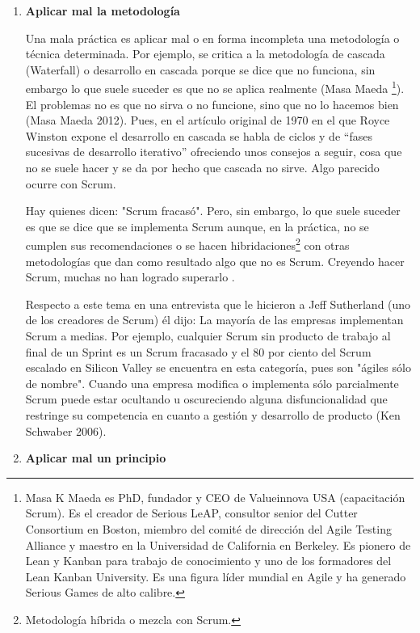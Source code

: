 \begin{enumerate}

\item \textbf{Aplicar mal la metodología}

Una mala práctica es aplicar mal o en forma incompleta una metodología o técnica determinada. Por ejemplo, se critica a la metodología de cascada (Waterfall) o desarrollo en cascada porque se dice que no funciona, sin embargo lo que suele suceder es que no se aplica realmente (Masa Maeda \footnote{Masa K Maeda es PhD, fundador y CEO de Valueinnova USA (capacitación Scrum). Es el creador de Serious LeAP, consultor senior del Cutter Consortium en Boston, miembro del comité de dirección del Agile Testing Alliance y maestro en la Universidad de California en Berkeley. Es pionero de Lean y Kanban para trabajo de conocimiento y uno de los formadores del Lean Kanban University. Es una figura líder mundial en Agile y ha generado Serious Games de alto calibre.}). El problemas no es que no sirva o no funcione, sino que no lo hacemos bien (Masa Maeda  2012). Pues, en el artículo original de 1970 en el que Royce Winston expone el desarrollo en cascada se habla de ciclos y de “fases sucesivas de desarrollo iterativo” \cite{Winston-Royce-1970} ofreciendo unos consejos a seguir, cosa que no se suele hacer y se da por hecho que cascada no sirve. Algo parecido ocurre con Scrum.

Hay quienes dicen:  "Scrum fracasó". Pero, sin embargo, lo que suele suceder es que se dice que se implementa Scrum aunque, en la práctica, no se cumplen sus recomendaciones o se hacen hibridaciones\footnote{Metodología híbrida o mezcla con Scrum.} con otras metodologías que dan como resultado algo que no es Scrum. Creyendo hacer Scrum, muchas no han logrado superarlo \cite{Gantthead-James-2010}.  

Respecto a este tema en una entrevista que le hicieron a Jeff Sutherland (uno de los creadores de Scrum) él dijo: La mayoría de las empresas implementan Scrum a medias. Por ejemplo, cualquier Scrum sin producto de trabajo al final de un Sprint es un Scrum fracasado y el 80 por ciento del Scrum escalado en Silicon Valley se encuentra en esta categoría, pues son "ágiles sólo de nombre". Cuando una empresa modifica o implementa sólo parcialmente Scrum puede estar ocultando u oscureciendo alguna disfuncionalidad que restringe su competencia en cuanto a gestión y desarrollo de producto (Ken Schwaber 2006).


\item \textbf{Aplicar mal un principio}


\end{enumerate}
